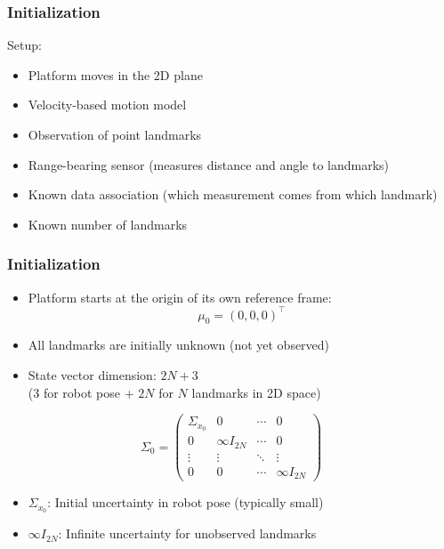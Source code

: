 \begin{frame}
    \frametitle{Initialization}
    Setup:
    \begin{itemize}
        \item Platform moves in the 2D plane
        \item Velocity-based motion model
        \item Observation of point landmarks
        \item Range-bearing sensor (measures distance and angle to landmarks)
        \item Known data association (which measurement comes from which landmark)
        \item Known number of landmarks
    \end{itemize}
\end{frame}

\begin{frame}
    \frametitle{Initialization}
    \begin{itemize}
        \item Platform starts at the origin of its own reference frame:
        \[ \mu_0 = (0, 0, 0)^{\top} \]
        \item All landmarks are initially unknown (not yet observed)
        \item State vector dimension: $2N + 3$ \\
        (3 for robot pose + $2N$ for $N$ landmarks in 2D space)
    \end{itemize}
    
    \[ \Sigma_0 = \begin{pmatrix}
        \Sigma_{x_0} & 0 & \cdots & 0 \\
        0 & \infty I_{2N} & \cdots & 0 \\
        \vdots & \vdots & \ddots & \vdots \\
        0 & 0 & \cdots & \infty I_{2N}
    \end{pmatrix} \]
    \begin{itemize}
        \item $\Sigma_{x_0}$: Initial uncertainty in robot pose (typically small)
        \item $\infty I_{2N}$: Infinite uncertainty for unobserved landmarks
    \end{itemize}
\end{frame}


